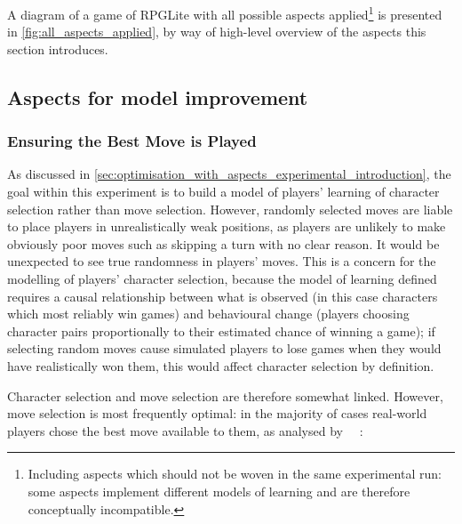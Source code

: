 A diagram of a game of RPGLite with all possible aspects
applied\footnote{Including aspects which should not be woven in the same
experimental run: some aspects implement different models of learning and are
therefore conceptually incompatible.} is
presented in \cref{fig:all_aspects_applied}, by way of high-level overview of
the aspects this section introduces.

\subsection{Aspects for model improvement}\label{subsec:aspects_improving_model}

\subsubsection{Ensuring the Best Move is Played}\label{subsubsec:ensure_best_move}


As discussed in \cref{sec:optimisation_with_aspects_experimental_introduction},
the goal within this experiment is to build a model of players' learning of
character selection rather than move selection. However, randomly selected moves
are liable to place players in unrealistically weak positions, as players are
unlikely to make obviously poor moves such as skipping a turn with no clear
reason. It would be unexpected to see true randomness in players' moves. This is
a concern for the modelling of players' character selection, because the model
of learning defined requires a causal relationship between what is observed (in
this case characters which most reliably win games) and behavioural change
(players choosing character pairs proportionally to their estimated chance of
winning a game); if selecting random moves cause simulated players to lose games
when they would have realistically won them, this would affect character
selection by definition.

Character selection and move selection are therefore somewhat linked. However,
move selection is most frequently optimal: in the majority of cases real-world
players chose the best move available to them, as analysed by \citeauthor{kavanagh2021gameplay}~\cite{kavanagh2021gameplay}~:

